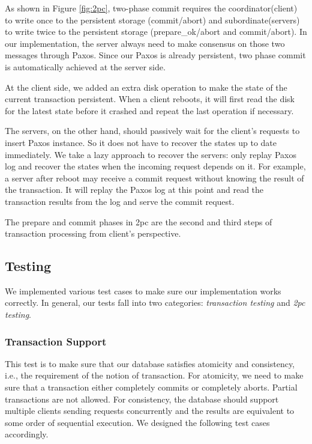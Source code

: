 \documentclass{vldb}
\begin{document}
As shown in Figure \ref{fig:2pc}, two-phase commit requires the 
coordinator(client) to write once to the persistent storage
(commit/abort) and subordinate(servers) to write twice to the 
persistent storage (prepare\_ok/abort and commit/abort). In our
implementation, the server always need to make consensus on those two 
messages through Paxos. Since our Paxos is already persistent, two 
phase commit is automatically achieved at the server side. 

At the client side, we added an extra disk operation to make the state 
of the current transaction persistent. When a client reboots, it will 
first read the disk for the latest state before it crashed and repeat 
the last operation if necessary. 

The servers, on the other hand, should passively wait for the client’s 
requests to insert Paxos instance. So it does not have to recover the 
states up to date immediately. We take a lazy approach to recover the 
servers: only replay Paxos log and recover the states when the 
incoming request depends on it. For example, a server after reboot may 
receive a commit request without knowing the result of the 
transaction. It will replay the Paxos log at this point and read the 
transaction results from the log and serve the commit request.

The prepare and commit phases in 2pc are the second and third steps of 
transaction processing from client's perspective.

\subsection{Testing}

We implemented various test cases to make sure our implementation 
works correctly. In general, our tests fall into two categories: 
\textit{transaction testing} and \textit{2pc testing}. 

\subsubsection{Transaction Support}

This test is to make sure that our database satisfies atomicity and 
consistency, i.e., the requirement of the notion of transaction. For 
atomicity, we need to make sure that a transaction either completely 
commits or completely aborts. Partial transactions are not allowed.  
For consistency, the database should support multiple clients sending 
requests concurrently and the results are equivalent to some order of 
sequential execution. We designed the following test cases 
accordingly.
\end{document}
